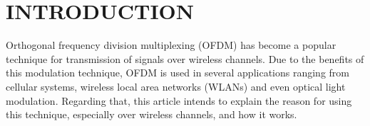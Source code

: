 \section{INTRODUCTION}

\par Orthogonal frequency division multiplexing (OFDM)
has become a popular technique for transmission of signals
over wireless channels. Due to the benefits of this modulation technique, OFDM is used in several applications ranging from cellular systems, wireless local area networks (WLANs) and even optical light modulation. Regarding that, this article intends to explain the reason for using this technique, especially over wireless channels, and how it works.
